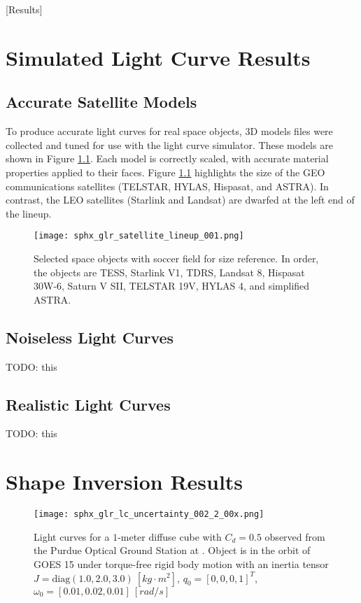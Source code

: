 [Results]
\graphicspath{{/Users/liamrobinson/Documents/PyLightCurves/docs/build/html/_images}}

\chapter{Simulated Light Curve Results}

\section{Accurate Satellite Models}

To produce accurate light curves for real space objects, 3D models files were collected and tuned for use with the light curve simulator. These models are shown in Figure \ref{fig:satellite_lineup}. Each model is correctly scaled, with accurate material properties applied to their faces. Figure \ref{fig:satellite_lineup} highlights the size of the GEO communications satellites (TELSTAR, HYLAS, Hispasat, and ASTRA). In contrast, the LEO satellites (Starlink and Landsat) are dwarfed at the left end of the lineup.

\begin{figure}[ht]
    \centering
    \texttt{[image: sphx\_glr\_satellite\_lineup\_001.png]}
    \caption{Selected space objects with soccer field for size reference. In order, the objects are TESS, Starlink V1, TDRS, Landsat 8, Hispasat 30W-6, Saturn V SII, TELSTAR 19V, HYLAS 4, and simplified ASTRA.
    }
    \label{fig:satellite_lineup}
\end{figure}

\section{Noiseless Light Curves}

TODO: this

\section{Realistic Light Curves}

TODO: this

\chapter{Shape Inversion Results}

\begin{figure}[!htb]
  \centering
  \texttt{[image: sphx\_glr\_lc\_uncertainty\_002\_2\_00x.png]}
  \caption{Light curves for a $1$-meter diffuse cube with $C_d = 0.5$ observed from the Purdue Optical Ground Station at \pogslla. Object is in the orbit of GOES 15 under torque-free rigid body motion with an inertia tensor $J = \mathrm{diag}(1.0, 2.0, 3.0) \: \left[kg \cdot m^2\right]$, $q_0 = \left[0, 0, 0, 1\right]^T$, $\omega_0 = \left[ 0.01, 0.02, 0.01 \right] \: \left[rad/s\right]$}
  \label{fig:cube_lcs}
\end{figure}

